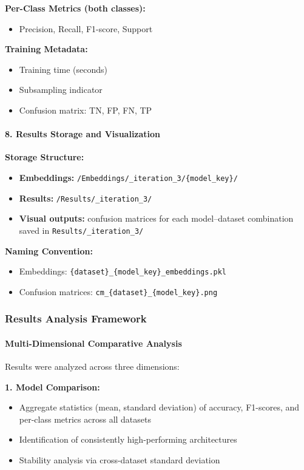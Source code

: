 \documentclass[11pt, titlepage, bibliography=totoc]{scrreprt}
\begin{document}
\textbf{Per-Class Metrics (both classes):}
\begin{itemize}
    \item Precision, Recall, F1-score, Support
\end{itemize}

\textbf{Training Metadata:}
\begin{itemize}
    \item Training time (seconds)
    \item Subsampling indicator
    \item Confusion matrix: TN, FP, FN, TP
\end{itemize}

\paragraph{8. Results Storage and Visualization}
\textbf{Storage Structure:}
\begin{itemize}
    \item \textbf{Embeddings:} \texttt{/Embeddings/\_iteration\_3/\{model\_key\}/}
    \item \textbf{Results:} \texttt{/Results/\_iteration\_3/}
    \item \textbf{Visual outputs:} confusion matrices for each model--dataset combination saved in \texttt{Results/\_iteration\_3/}
\end{itemize}

\textbf{Naming Convention:}
\begin{itemize}
    \item Embeddings: \texttt{\{dataset\}\_\{model\_key\}\_embeddings.pkl}
    \item Confusion matrices: \texttt{cm\_\{dataset\}\_\{model\_key\}.png}
\end{itemize}

\subsubsection{Results Analysis Framework}

\paragraph{Multi-Dimensional Comparative Analysis}
Results were analyzed across three dimensions:

\textbf{1. Model Comparison:}
\begin{itemize}
    \item Aggregate statistics (mean, standard deviation) of accuracy, F1-scores, and per-class metrics across all datasets
    \item Identification of consistently high-performing architectures
    \item Stability analysis via cross-dataset standard deviation
\end{itemize}
\end{document}
